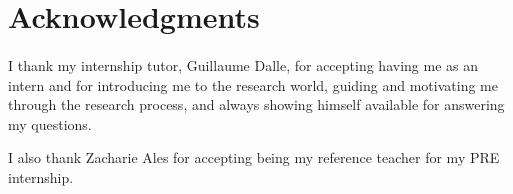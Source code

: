 \section*{Acknowledgments}
\paragraph{}
I thank my internship tutor, Guillaume Dalle, for accepting having me as an intern and for introducing me to the research world, guiding and motivating me through the research process, and always showing himself available for answering my questions.

I also thank Zacharie Ales for accepting being my reference teacher for my PRE internship.